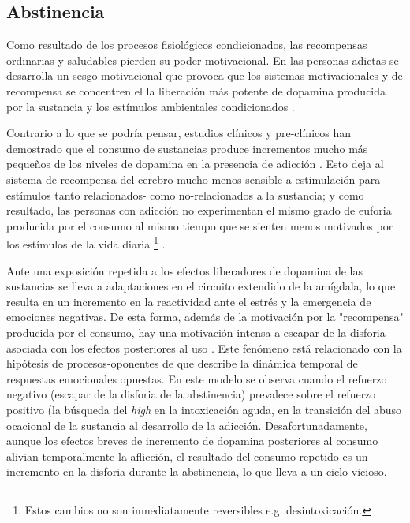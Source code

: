 \subsection{Abstinencia}
\label{abst}
Como resultado de los procesos fisiológicos condicionados, las recompensas ordinarias y saludables pierden su poder motivacional.
En las personas adictas se desarrolla un sesgo motivacional que provoca que los sistemas motivacionales y de recompensa se concentren el la liberación más potente de dopamina producida por la sustancia \textemdash{} y los estímulos ambientales condicionados \parencite{Volkow2016}.\par
Contrario a lo que se podría pensar, estudios clínicos y pre-clínicos han demostrado que el consumo de sustancias produce incrementos mucho más pequeños de los niveles de dopamina en la presencia de adicción \parencite{Volkow1997,Zhang2013,Volkow2014}.
Esto deja al sistema de recompensa del cerebro mucho menos sensible a estimulación para estímulos tanto relacionados- como no-relacionados a la sustancia; y como resultado, las personas con adicción no experimentan el mismo grado de euforia producida por el consumo al mismo tiempo que se sienten menos motivados por los estímulos de la vida diaria
\footnote{Estos cambios no son inmediatamente reversibles e.g. desintoxicación.} \parencite{Volkow2016}.\par
Ante una exposición repetida a los efectos liberadores de dopamina de las sustancias se lleva a adaptaciones en el circuito extendido de la amígdala, lo que resulta en un incremento en la reactividad ante el estrés y la emergencia de emociones negativas.
De esta forma, además de la motivación por la "recompensa" producida por el consumo, hay una motivación intensa a escapar de la disforia asociada con los efectos posteriores al uso \parencite{Goldstein2012a,Volkow2016}.
Este fenómeno está relacionado con la hipótesis de procesos-oponentes de \textcite{Solomon1978} que describe la dinámica temporal de respuestas emocionales opuestas.
En este modelo se observa cuando el refuerzo negativo (escapar de la disforia de la abstinencia) prevalece sobre el refuerzo positivo (la búsqueda del \textit{high} en la intoxicación aguda, en la transición del abuso ocacional de la sustancia al desarrollo de la adicción.
Desafortunadamente, aunque los efectos breves de incremento de dopamina posteriores al consumo alivian temporalmente la aflicción, el resultado del consumo repetido es un incremento en la disforia durante la abstinencia, lo que lleva a un ciclo vicioso.

